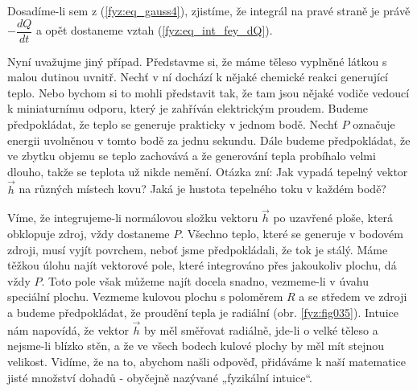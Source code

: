       Dosadíme-li sem z (\ref{fyz:eq_gauss4}), zjistíme, že integrál na pravé straně je právě
      \(-\dfrac{dQ}{dt}\) a opět dostaneme vztah (\ref{fyz:eq_int_fey_dQ}).
      
      Nyní uvažujme jiný případ. Představme si, že máme těleso vyplněné látkou s malou dutinou 
      uvnitř. Nechť v ní dochází k nějaké chemické reakci generující teplo. Nebo bychom si to mohli 
      představit tak, že tam jsou nějaké vodiče vedoucí k miniaturnímu odporu, který je zahříván 
      elektrickým proudem. Budeme předpokládat, že teplo se generuje prakticky v jednom bodě. Nechť 
      \(P\) označuje energii uvolněnou v tomto bodě za jednu sekundu. Dále budeme předpokládat, že 
      ve zbytku objemu se teplo zachovává a že generování tepla probíhalo velmi dlouho, takže se 
      teplota už nikde nemění. Otázka zní: Jak vypadá tepelný vektor \(\vec{h}\) na různých místech 
      kovu? Jaká je hustota tepelného toku v každém bodě?
      
      Víme, že integrujeme-li normálovou složku vektoru \(\vec{h}\) po uzavřené ploše, která 
      obklopuje zdroj, vždy dostaneme \(P\). Všechno teplo, které se generuje v bodovém zdroji, 
      musí vyjít povrchem, neboť jsme předpokládali, že tok je stálý. Máme těžkou úlohu najít 
      vektorové pole, které integrováno přes jakoukoliv plochu, dá vždy \(P\). Toto pole však 
      můžeme najít docela snadno, vezmeme-li v úvahu speciální plochu. Vezmeme kulovou plochu s 
      poloměrem \(R\) a se středem ve zdroji a budeme předpokládat, že proudění tepla je radiální 
      (obr. \ref{fyz:fig035}). Intuice nám napovídá, že vektor \(\vec{h}\) by měl 
      směřovat radiálně, jde-li o velké těleso a nejsme-li blízko stěn, a že ve všech bodech kulové 
      plochy by měl mít stejnou velikost. Vidíme, že na to, abychom našli odpověď, přidáváme k naší 
      matematice jisté množství dohadů - obyčejně nazývané „fyzikální intuice“.


